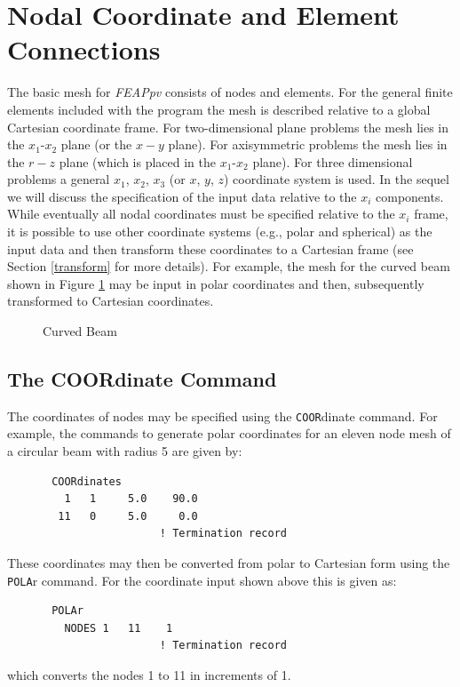\section{Nodal Coordinate and Element Connections}

The basic mesh for {\sl FEAPpv} consists of nodes and elements.
For the general finite elements included with the program the mesh
is described relative to a global Cartesian coordinate frame.  For
two-dimensional plane problems the mesh lies in the $x_1$-$x_2$ plane
(or the $x-y$ plane).  For axisymmetric problems the mesh lies in the
$r-z$ plane (which is placed in the $x_1$-$x_2$ plane).  For three
dimensional problems a general $x_1$, $x_2$, $x_3$ (or $x$, $y$, $z$)
coordinate system is used.  In the sequel we will discuss the specification
of the input data relative to the $x_i$ components.  While eventually all
nodal coordinates must be specified relative to the $x_i$ frame, it is
possible to use other coordinate systems (e.g., polar and spherical)
as the input data and
then transform these coordinates to a Cartesian frame
(see Section \ref{transform} for more details).  For example,
the mesh for the curved beam shown in Figure \ref{fig71} may be input
in polar coordinates and then, subsequently transformed to
Cartesian coordinates.

\begin{figure}[ht!]
\caption{Curved Beam}
\label{fig71}
\end{figure}

\subsection{The COORdinate Command}
\label{coord}

The coordinates of nodes may be specified using the {\tt COOR}dinate
command.  For example,
the commands to generate polar coordinates for an eleven node mesh of a
circular beam with radius 5 are given by:
\begin{verbatim}
       COORdinates
         1   1     5.0    90.0
        11   0     5.0     0.0
                        ! Termination record
\end{verbatim}
These coordinates may then be converted from polar to Cartesian form
using the {\tt POLA}r command.  For the coordinate input shown above this
is given as:
\begin{verbatim}
       POLAr
         NODES 1   11    1
                        ! Termination record
\end{verbatim}
which converts the nodes 1 to 11 in increments of 1.


